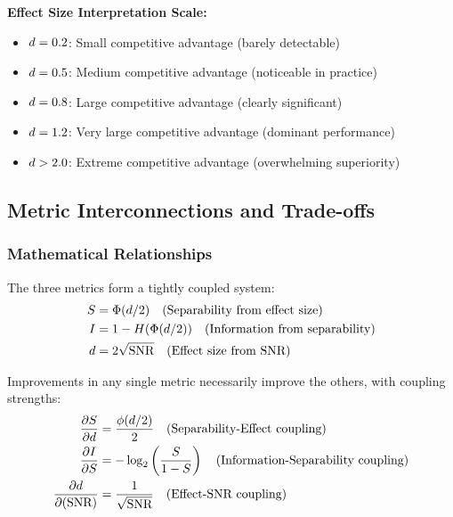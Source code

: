 \textbf{Effect Size Interpretation Scale:}
\begin{itemize}
\item $d = 0.2$: Small competitive advantage (barely detectable)
\item $d = 0.5$: Medium competitive advantage (noticeable in practice)
\item $d = 0.8$: Large competitive advantage (clearly significant)
\item $d = 1.2$: Very large competitive advantage (dominant performance)
\item $d > 2.0$: Extreme competitive advantage (overwhelming superiority)
\end{itemize}

\subsection{Metric Interconnections and Trade-offs}

\subsubsection{Mathematical Relationships}

The three metrics form a tightly coupled system:
\begin{align}
S &= \Phi(d/2) \quad \text{(Separability from effect size)} \\
I &= 1 - H(\Phi(d/2)) \quad \text{(Information from separability)} \\
d &= 2\sqrt{\text{SNR}} \quad \text{(Effect size from SNR)}
\end{align}

\begin{theorem}
\label{thm:metric_coupling}
Improvements in any single metric necessarily improve the others, with coupling strengths:
\begin{align}
\frac{\partial S}{\partial d} &= \frac{\phi(d/2)}{2} \quad \text{(Separability-Effect coupling)} \\
\frac{\partial I}{\partial S} &= -\log_2\left(\frac{S}{1-S}\right) \quad \text{(Information-Separability coupling)} \\
\frac{\partial d}{\partial(\text{SNR})} &= \frac{1}{\sqrt{\text{SNR}}} \quad \text{(Effect-SNR coupling)}
\end{align}
\end{theorem}

